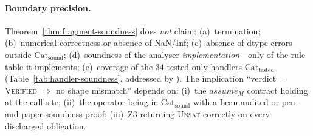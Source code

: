 \paragraph{Boundary precision.}
Theorem~\ref{thm:fragment-soundness} does \emph{not} claim:
(a)~termination;
(b)~numerical correctness or absence of NaN/Inf;
(c)~absence of dtype errors outside $\mathrm{Cat}_{\mathrm{sound}}$;
(d)~soundness of the analyser \emph{implementation}---only of the rule
table it implements;
(e)~coverage of the $34$ tested-only handlers
$\mathrm{Cat}_{\mathrm{tested}}$ (Table~\ref{tab:handler-soundness},
addressed by ).
The implication ``verdict = \textsc{Verified} $\Rightarrow$ no shape mismatch''
depends on: (i)~the $\mathit{assume}_M$ contract holding at the call site;
(ii)~the operator being in $\mathrm{Cat}_{\mathrm{sound}}$ with a
Lean-audited or pen-and-paper soundness proof; (iii)~Z3 returning
\textsc{Unsat} correctly on every discharged obligation.

